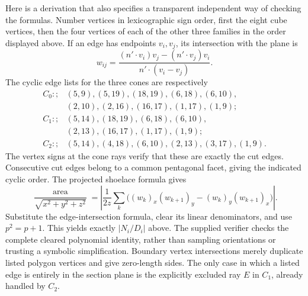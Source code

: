 Here is a derivation that also specifies a transparent independent way of
checking the formulas.  Number vertices in lexicographic sign order, first
the eight cube vertices, then the four vertices of each of the other three
families in the order displayed above.  If an edge has endpoints $v_i,v_j$,
its intersection with the plane is
\[
 w_{ij}=\frac{(n'\cdot v_i)v_j-(n'\cdot v_j)v_i}
                   {n'\cdot(v_i-v_j)}.
\]
The cyclic edge lists for the three cones are respectively
\begin{align*}
 C_0:;&(5,9),(5,19),(18,19),(6,18),(6,10),\\
      &(2,10),(2,16),(16,17),(1,17),(1,9);\\
 C_1:;&(5,14),(18,19),(6,18),(6,10),\\
      &(2,13),(16,17),(1,17),(1,9);\\
 C_2:;&(5,14),(4,18),(6,10),(2,13),(3,17),(1,9).
\end{align*}
The vertex signs at the cone rays verify that these are exactly the cut
edges.  Consecutive cut edges belong to a common pentagonal facet, giving
the indicated cyclic order.  The projected shoelace formula gives
\[
 \frac{\operatorname{area}}{\sqrt{x^2+y^2+z^2}}
 =\left|\frac1{2z}\sum_k
   \bigl((w_k)_x(w_{k+1})_y-(w_k)_y(w_{k+1})_x\bigr)\right|.
\]
Substitute the edge-intersection formula, clear its linear denominators,
and use $p^2=p+1$.  This yields exactly $|N_i/D_i|$ above.  The supplied
verifier checks the complete cleared polynomial identity, rather than
sampling orientations or trusting a symbolic simplification.  Boundary
vertex intersections merely duplicate listed polygon vertices and give
zero-length sides.  The only case in which a listed edge is entirely in
the section plane is the explicitly excluded ray $E$ in $C_1$, already
handled by $C_2$.

